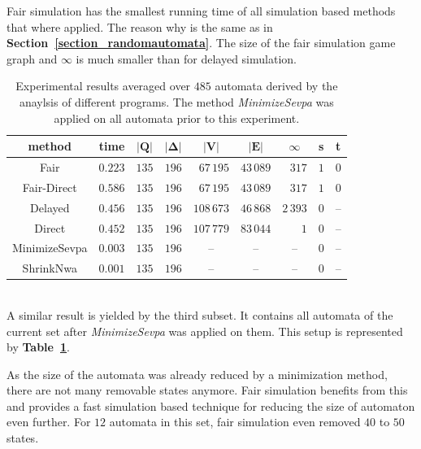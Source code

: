 \documentclass[12pt,oneside,bibliography=totoc,abstracton]{scrartcl}
\newcommand{\emptyccell}{\multicolumn{1}{c}{--}}
\newcommand{\emptyccellrightended}{\multicolumn{1}{c|}{--}}
\newcommand{\tableref}[1]{\textbf{Table~\ref{#1}}}
\newcommand{\sectionref}[1]{\textbf{Section~\ref{#1}}}
\begin{document}
Fair simulation has the smallest running time of all simulation based methods that where applied.
The reason why is the same as in \sectionref{section_randomautomata}.
The size of the fair simulation game graph and $\infty$ is much smaller than for delayed simulation.\\
\begin{table}[h]
	 \begin{center}
		\begin{tabular}{|c|lrrrrrrr|}
			\hline
			\multicolumn{1}{|c|}{\cellcolor{black!30}\textbf{method}}
			&\multicolumn{1}{c}{\cellcolor{black!30}\textbf{time}}
			&\multicolumn{1}{c}{\cellcolor{black!30}$\bm{|Q|}$}
			&\multicolumn{1}{c}{\cellcolor{black!30}$\bm{|\Delta|}$}
			&\multicolumn{1}{c}{\cellcolor{black!30}$\bm{|V|}$}
			&\multicolumn{1}{c}{\cellcolor{black!30}$\bm{|E|}$}
			&\multicolumn{1}{c}{\cellcolor{black!30}$\bm{\infty}$}
			&\multicolumn{1}{c}{\cellcolor{black!30}\textbf{s}}
			&\multicolumn{1}{c|}{\cellcolor{black!30}\textbf{t}}\\
			\hline
			Fair			&$0.223$	&$135$	&$196$	&$67\,195$	&$43\,089$	&$317$	&$1$	&$0$\\
			Fair-Direct		&$0.586$	&$135$	&$196$	&$67\,195$	&$43\,089$	&$317$	&$1$	&$0$\\
			Delayed		&$0.456$	&$135$	&$196$	&$108\,673$	&$46\,868$	&$2\,393$	&$0$	&\emptyccellrightended\\
			Direct			&$0.452$	&$135$	&$196$	&$107\,779$	&$83\,044$	&$1$		&$0$	&\emptyccellrightended\\
			MinimizeSevpa	&$0.003$	&$135$	&$196$	&\emptyccell	&\emptyccell	&\emptyccell	&$0$	&\emptyccellrightended\\
			ShrinkNwa		&$0.001$	&$135$	&$196$	&\emptyccell	&\emptyccell	&\emptyccell	&$0$	&\emptyccellrightended\\
			\hline
		\end{tabular}
	\end{center}
	\caption{Experimental results averaged over $485$ automata derived by the anaylsis of different programs.
		The method \textit{MinimizeSevpa} was applied on all automata prior to this experiment.}
	\label{fullautomataminsevpa}
\end{table}\quad\\
A similar result is yielded by the third subset. It contains all automata of the current set
after \textit{MinimizeSevpa} was applied on them. This setup is represented by \tableref{fullautomataminsevpa}.

As the size of the automata was already reduced by a minimization method, there are not many removable states anymore.
Fair simulation benefits from this and provides a fast simulation based technique for reducing the size of automaton even further.
For $12$ automata in this set, fair simulation even removed $40$ to $50$ states.
\end{document}
